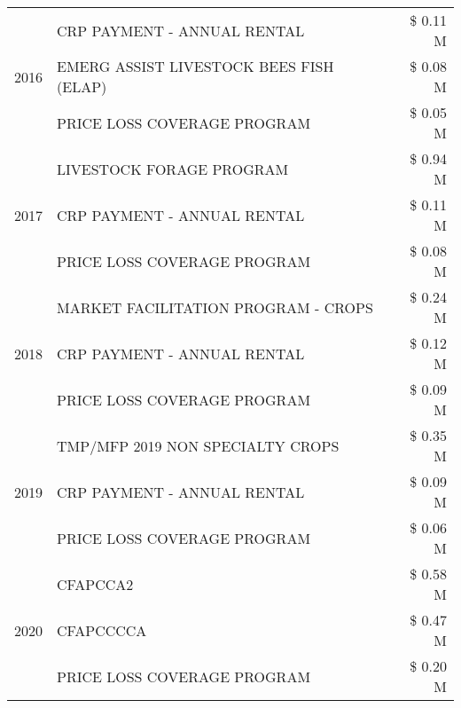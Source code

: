\begin{tabular}{llr}
\cline{1-3}
\multirow[t]{3}{*}{2016} & CRP PAYMENT - ANNUAL RENTAL                   & \$ 0.11 M \\
 & EMERG ASSIST LIVESTOCK BEES FISH (ELAP)       & \$ 0.08 M \\
 & PRICE LOSS COVERAGE PROGRAM                   & \$ 0.05 M \\
\cline{1-3}
\multirow[t]{3}{*}{2017} & LIVESTOCK FORAGE PROGRAM & \$ 0.94 M \\
 & CRP PAYMENT - ANNUAL RENTAL & \$ 0.11 M \\
 & PRICE LOSS COVERAGE PROGRAM & \$ 0.08 M \\
\cline{1-3}
\multirow[t]{3}{*}{2018} & MARKET FACILITATION PROGRAM - CROPS & \$ 0.24 M \\
 & CRP PAYMENT - ANNUAL RENTAL & \$ 0.12 M \\
 & PRICE LOSS COVERAGE PROGRAM & \$ 0.09 M \\
\cline{1-3}
\multirow[t]{3}{*}{2019} & TMP/MFP 2019 NON SPECIALTY CROPS & \$ 0.35 M \\
 & CRP PAYMENT - ANNUAL RENTAL & \$ 0.09 M \\
 & PRICE LOSS COVERAGE PROGRAM & \$ 0.06 M \\
\cline{1-3}
\multirow[t]{3}{*}{2020} & CFAPCCA2 & \$ 0.58 M \\
 & CFAPCCCCA & \$ 0.47 M \\
 & PRICE LOSS COVERAGE PROGRAM & \$ 0.20 M \\
\cline{1-3}
\bottomrule
\end{tabular}
